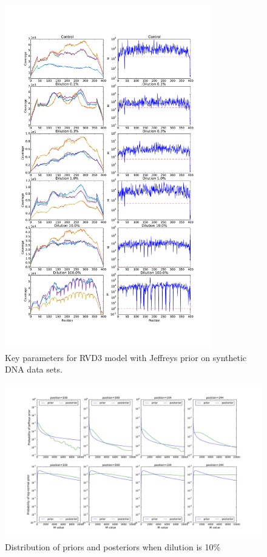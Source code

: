 \documentclass[11pt,reqno]{amsart}
\begin{document}
\begin{figure}[htbp]
\begin{center}
\includegraphics[width=90mm]{figs/M_jeffrey.pdf}
\caption{Key parameters for RVD3 model with Jeffreys prior on synthetic DNA data sets.}
\label{fig:M_jeffrey}
\end{center}
\end{figure}

\begin{figure}[!tbp]
\begin{center}
\includegraphics[width=190mm]{figs/post_prior_dilu_10.pdf}
\caption{Distribution of priors and posteriors when dilution is 10\%}
\label{fig:dilu_10}
\end{center}
\end{figure}
\end{document}
